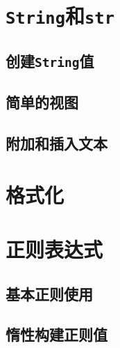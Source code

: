 \section{\texttt{String}和\texttt{str}}

\subsection{创建\texttt{String}值}

\subsection{简单的视图}

\subsection{附加和插入文本}\label{AppendText}

\section{格式化}\label{format}

\section{正则表达式}

\subsection{基本正则使用}

\subsection{惰性构建正则值}\label{LazyRegex}
